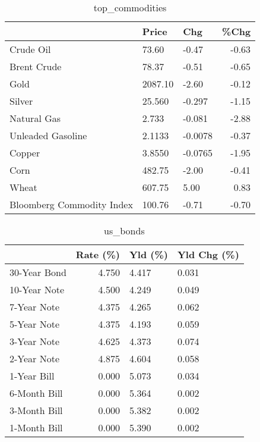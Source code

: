 \documentclass{article}%
\begin{document}
\begin{table}[htbp]%
\caption{top\_commodities}%
\centering%
\begin{adjustbox}{width=1\textwidth}%
\begin{tabular}{lllr}
\toprule
                          &   Price &     Chg &  \%Chg \\
\midrule
               Crude Oil  &   73.60 &   -0.47 & -0.63 \\
             Brent Crude  &   78.37 &   -0.51 & -0.65 \\
                    Gold  & 2087.10 &   -2.60 & -0.12 \\
                  Silver  &  25.560 &  -0.297 & -1.15 \\
             Natural Gas  &   2.733 &  -0.081 & -2.88 \\
       Unleaded Gasoline  &  2.1133 & -0.0078 & -0.37 \\
                  Copper  &  3.8550 & -0.0765 & -1.95 \\
                    Corn  &  482.75 &   -2.00 & -0.41 \\
                   Wheat  &  607.75 &    5.00 &  0.83 \\
Bloomberg Commodity Index &  100.76 &   -0.71 & -0.70 \\
\bottomrule
\end{tabular}
%
\end{adjustbox}%
\end{table}

%


\begin{table}[htbp]%
\caption{us\_bonds}%
\centering%
\begin{adjustbox}{width=1\textwidth}%
\begin{tabular}{lrll}
\toprule
             &  Rate (\%) & Yld (\%) & Yld Chg (\%) \\
\midrule
30-Year Bond &     4.750 &   4.417 &       0.031 \\
10-Year Note &     4.500 &   4.249 &       0.049 \\
 7-Year Note &     4.375 &   4.265 &       0.062 \\
 5-Year Note &     4.375 &   4.193 &       0.059 \\
 3-Year Note &     4.625 &   4.373 &       0.074 \\
 2-Year Note &     4.875 &   4.604 &       0.058 \\
 1-Year Bill &     0.000 &   5.073 &       0.034 \\
6-Month Bill &     0.000 &   5.364 &       0.002 \\
3-Month Bill &     0.000 &   5.382 &       0.002 \\
1-Month Bill &     0.000 &   5.390 &       0.002 \\
\bottomrule
\end{tabular}
%
\end{adjustbox}%
\end{table}
\end{document}
